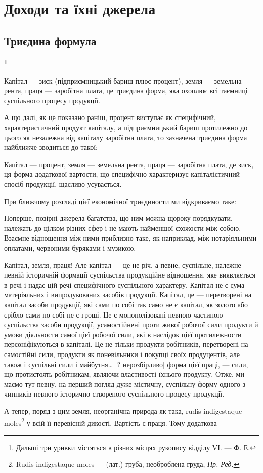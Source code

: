 
\chapter{Доходи та їхні джерела}

\section{Триєдина формула}

\subsubsection{\footnote{
Дальші три уривки містяться в різних місцях рукопису відділу VІ. — Ф. Е.
}}

Капітал — зиск (підприємницький бариш плюс процент), земля — земельна
рента, праця — заробітна плата, це триєдина форма, яка охоплює всі таємниці
суспільного процесу продукції.

А що далі, як це показано раніш, процент виступає як специфічний,
характеристичний продукт капіталу, а підприємницький бариш протилежно
до цього як незалежна від капіталу заробітна плата, то зазначена триєдина
форма найближче зводиться до такої:

Капітал — процент, земля — земельна рента, праця — заробітна плата, де зиск,
ця форма додаткової вартости, що специфічно характеризує капіталістичний спосіб
продукції, щасливо усувається.

При ближчому розгляді цієї економічної триєдиности ми відкриваємо таке:

Поперше, позірні джерела багатства, що ним можна щороку порядкувати,
належать до цілком різних сфер і не мають найменшої схожости між собою.
Взаємне відношення між ними приблизно таке, як наприклад, між нотаріяльними
оплатами, червоними буряками і музикою.

Капітал, земля, праця! Але капітал — це не річ, а певне, суспільне,
належне певній історичній формації суспільства продукційне відношення, яке
виявляється в речі і надає цій речі специфічного суспільного характеру. Капітал
не є сума матеріяльних і випродукованих засобів продукції. Капітал, це —
перетворені на капітал засоби продукції, які сами по собі так само не є капітал,
як золото або срібло сами по собі не є гроші. Це є монополізовані певною
частиною суспільства засоби продукції, усамостійнені проти живої робочої сили
продукти й умови діяльности самої цієї робочої сили, які в наслідок цієї протилежности
персоніфікуються в капіталі. Це не тільки продукти робітників,
перетворені на самостійні сили, продукти як поневільники і покупці своїх продуцентів,
але також і суспільні сили і майбутня\dots{} [? нерозбірливо] форма цієї
праці, — сили, що протистоять робітникам, являючи властивості їхнього продукту.
Отже, ми маємо тут певну, на перший погляд дуже містичну, суспільну форму
одного з чинників певного історично створеного суспільного процесу продукції.

А тепер, поряд з цим земля, неорганічна природа як така, rudis indigestaque
moles\footnote*{
Rudis indigestaque moles — (лат.) груба, необроблена груда, \emph{Пр. Ред.}
} у всій її перевісній дикості. Вартість є праця. Тому додаткова
\parbreak{}  %

